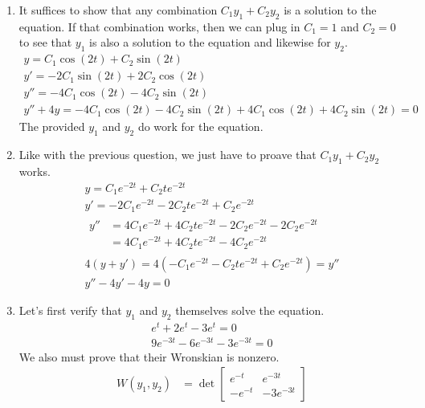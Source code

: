 \documentclass[12pt]{article}
\begin{document}
\begin{enumerate}
    \item It suffices to show that any combination $C_1y_1+C_2y_2$ is a solution to the equation.
          If that combination works, then we can plug in $C_1=1$ and $C_2=0$ to see that $y_1$
          is also a solution to the equation and likewise for $y_2$.
          \begin{gather*}
              y=C_1\cos(2t)+C_2\sin(2t) \\
              y'=-2C_1\sin(2t)+2C_2\cos(2t) \\
              y''=-4C_1\cos(2t)-4C_2\sin(2t) \\
              y''+4y=-4C_1\cos(2t)-4C_2\sin(2t)+4C_1\cos(2t)+4C_2\sin(2t)=0
          \end{gather*}
          The provided $y_1$ and $y_2$ do work for the equation.
    \item Like with the previous question, we just have to proave that $C_1y_1+C_2y_2$ works.
          \begin{gather*}
              y=C_1e^{-2t}+C_2te^{-2t}                                \\
              y'=-2C_1e^{-2t}-2C_2te^{-2t}+C_2e^{-2t} \\
              \begin{aligned}
                  y'' & =4C_1e^{-2t}+4C_2te^{-2t}-2C_2e^{-2t}-2C_2e^{-2t} \\
                      & = 4C_1e^{-2t}+4C_2te^{-2t}-4C_2e^{-2t}
              \end{aligned} \\
              4(y+y')=4(-C_1e^{-2t}-C_2te^{-2t}+C_2e^{-2t})=y'' \\
              y''-4y'-4y=0
          \end{gather*}
    \item Let's first verify that $y_1$ and $y_2$ themselves solve the equation.
          \begin{gather*}
              e^t+2e^t-3e^t=0 \\
              9e^{-3t}-6e^{-3t}-3e^{-3t}=0
          \end{gather*}
          We also must prove that their Wronskian is nonzero.
          \begin{align*}
              W(y_1, y_2) & = \det \begin{bmatrix}
                                       e^{-t}  & e^{-3t}   \\
                                       -e^{-t} & -3e^{-3t}

\end{bmatrix}
\end{align*}
\end{enumerate}
\end{document}
